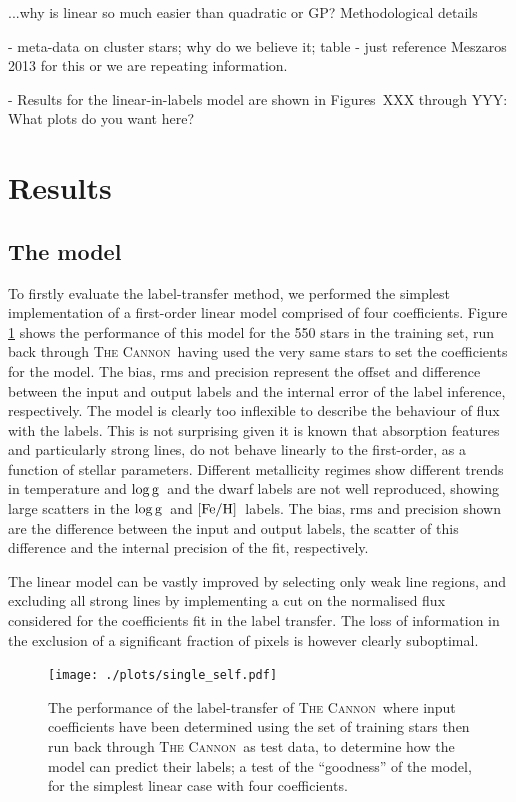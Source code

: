 \documentclass[12pt, preprint]{aastex}
\newcommand{\feh}{\mbox{$\rm [Fe/H]$}}
\newcommand{\logg}{\mbox{$\rm \log g$}}
\newcommand{\tc}{\textsc{The Cannon}}
\begin{document}
...why is linear so much easier than quadratic or GP?  Methodological details

- meta-data on cluster stars; why do we believe it; table - just reference Meszaros 2013 for this or we are repeating information. 

- Results for the linear-in-labels model are shown in Figures~XXX through YYY: What plots do you want here? 

\section{Results}

\subsection{The model} 

To firstly evaluate the label-transfer method, we performed the simplest implementation of a first-order linear model comprised of four coefficients. Figure \ref{fig:self1} shows the performance of this model for the 550 stars in the training set, run back through \tc\, having used the very same stars to set the coefficients for the model. The bias, rms and precision represent the offset and difference between the input and output labels and the internal error of the label inference, respectively. The model is clearly too inflexible to describe the behaviour of flux with the labels. This is not surprising given it is known that absorption features and particularly strong lines, do not behave linearly to the first-order, as a function of stellar parameters. Different metallicity regimes show different trends in  temperature and \logg\ and the dwarf labels are not well reproduced, showing large scatters in the \logg\ and \feh\ labels. The bias, rms and precision shown are the difference between the input and output labels, the scatter of this difference and the internal precision of the fit, respectively. 

The linear model can be vastly improved by selecting only weak line regions, and excluding all strong lines by implementing a cut on the normalised flux considered for the coefficients fit in the label transfer. The loss of information in the exclusion of a significant fraction of pixels is however clearly suboptimal. 

\begin{figure}[h!]
\centering
  \texttt{[image: ./plots/single\_self.pdf]}
\caption{The performance of the label-transfer of \tc\, where input coefficients have been determined using the set of training stars then run back through \tc\ as test data, to determine how the model can predict their labels; a test of the ``goodness'' of the model, for the simplest linear case with four coefficients. }
\label{fig:self1}
\end{figure}
\end{document}
